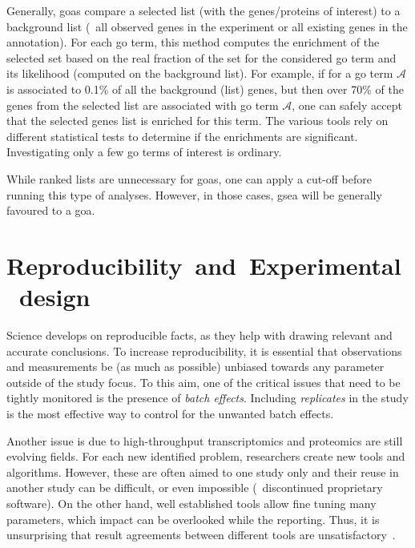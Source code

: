 Generally, \glspl{goa} compare a selected list (with the genes/proteins of interest)
to a background list
(\eg\ all observed genes in the experiment or all existing genes in the annotation).
For each \gls{go} term,
this method computes the enrichment of the selected set based on
the real fraction of the set for the considered \gls{go} term and its likelihood
(computed on the background list).
For example, if for a \gls{go} term $\mathcal{A}$ is associated to 0.1\%
of all the background (list) genes,
but then over 70\% of the genes from the selected list are associated
with \gls{go} term $\mathcal{A}$,
one can safely accept that the selected genes list is enriched for this term.
The various tools rely on different statistical tests to determine
if the enrichments are significant.
Investigating only a few \gls{go} terms of interest is ordinary.

While ranked lists are unnecessary for \glspl{goa},
one can apply a cut-off before running this type of analyses.
However, in those cases,
\gls{gsea} will be generally favoured to a \gls{goa}.

\section{Reproducibility~and~Experimental~design}\label{sec:expDesign}

Science develops on reproducible facts,
as they help with drawing relevant and accurate conclusions.
To increase reproducibility,
it is essential that observations and measurements
be (as much as possible) unbiased
towards any parameter outside of the study focus.
To this aim, one of the critical issues that need to be tightly monitored
is the presence of \emph{batch effects}.
Including \emph{replicates} in the study is the most effective way to control
for the unwanted batch effects.\\
\vspace{-\baselineskip}

Another issue is due to high-throughput transcriptomics and proteomics
are still evolving fields.
For each new identified problem,
researchers create new tools and algorithms.
However, these are often aimed to one study only
and their reuse in another study can be difficult,
or even impossible (\eg\ discontinued proprietary software).
On the other hand, well established tools allow fine tuning many parameters,
which impact can be overlooked while the reporting.
Thus, it is unsurprising that result agreements between different tools
are unsatisfactory~.

